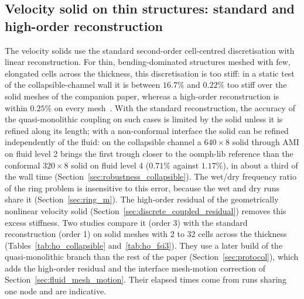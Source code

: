 \subsection{Velocity solid on thin structures: standard and high-order reconstruction}\label{sec:lim_thin_solid}

The velocity solids use the standard second-order cell-centred discretisation with linear reconstruction.
For thin, bending-dominated structures meshed with few, elongated cells across the thickness, this discretisation is too stiff: in a static test of the collapsible-channel wall it is between $16.7\%$ and $0.22\%$ too stiff over the solid meshes of the companion paper, whereas a high-order reconstruction is within $0.25\%$ on every mesh~\citep{CardiffFSIVerification2026}.
With the standard reconstruction, the accuracy of the quasi-monolithic coupling on such cases is limited by the solid unless it is refined along its length; with a non-conformal interface the solid can be refined independently of the fluid: on the collapsible channel a $640\times8$ solid through AMI on fluid level 2 brings the first trough closer to the oomph-lib reference than the conformal $320\times8$ solid on fluid level 4 ($0.71\%$ against $1.17\%$), in about a third of the wall time (Section~\ref{sec:robustness_collapsible}).
The wet/dry frequency ratio of the ring problem is insensitive to this error, because the wet and dry runs share it (Section~\ref{sec:ring_m}).
The high-order residual of the geometrically nonlinear velocity solid (Section~\ref{sec:discrete_coupled_residual}) removes this excess stiffness.
Two studies compare it (order 3) with the standard reconstruction (order 1) on solid meshes with 2 to 32 cells across the thickness (Tables~\ref{tab:ho_collapsible} and~\ref{tab:ho_fsi3}).
They use a later build of the quasi-monolithic branch than the rest of the paper (Section~\ref{sec:protocol}), which adds the high-order residual and the interface mesh-motion correction of Section~\ref{sec:fluid_mesh_motion}.
Their elapsed times come from runs sharing one node and are indicative.

